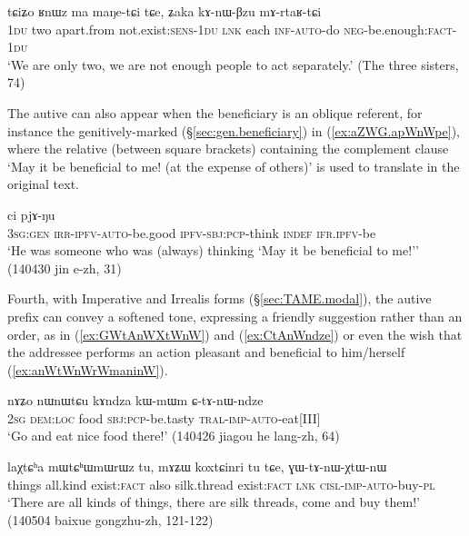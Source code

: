    \begin{exe}
\ex \label{ex:kAnWBzu.mArtaRtCi}
\gll tɕiʑo ʁnɯz ma maŋe-tɕi tɕe, ʑaka kɤ-nɯ-βzu mɤ-rtaʁ-tɕi \\
\textsc{1du} two apart.from not.exist:\textsc{sens}-\textsc{1du} \textsc{lnk} each \textsc{inf}-\textsc{auto}-do \textsc{neg}-be.enough:\textsc{fact}-\textsc{1du} \\
\glt `We are only two, we are not enough people to act separately.' (The three sisters, 74)
\end{exe} 

The autive can also appear when the beneficiary is an oblique referent, for instance the genitively-marked  (§\ref{sec:gen.beneficiary}) in (\ref{ex:aZWG.apWnWpe}), where the relative (between square brackets) containing the complement clause  `May it be beneficial to me! (at the expense of others)' is used to translate  in the original text.

   \begin{exe}
\ex \label{ex:aZWG.apWnWpe}
 ci pjɤ-ŋu \\
\textsc{3sg}:\textsc{gen} \textsc{irr}-\textsc{ipfv}-\textsc{auto}-be.good \textsc{ipfv}-\textsc{sbj}:\textsc{pcp}-think \textsc{indef} \textsc{ifr}.\textsc{ipfv}-be   \\
\glt `He was someone who was (always) thinking `May it be beneficial to me!'' (140430 jin e-zh, 31)
\end{exe} 

Fourth, with Imperative and Irrealis forms (§\ref{sec:TAME.modal}), the autive prefix can convey a softened tone, expressing a friendly suggestion rather than an order, as in   (\ref{ex:GWtAnWXtWnW}) and (\ref{ex:CtAnWndze}) or even the wish that the addressee performs an action pleasant and beneficial to him/herself (\ref{ex:anWtWnWrWmaninW}).


\begin{exe}
\ex \label{ex:CtAnWndze}
\gll nɤʑo nɯnɯtɕu kɤndza kɯ-mɯm ɕ-tɤ-nɯ-ndze  \\
\textsc{2sg} \textsc{dem}:\textsc{loc} food \textsc{sbj}:\textsc{pcp}-be.tasty \textsc{tral}-\textsc{imp}-\textsc{auto}-eat[III] \\
\glt `Go and eat nice food there!' (140426 jiagou he lang-zh, 64)
\end{exe}

\begin{exe}
\ex \label{ex:GWtAnWXtWnW}
\gll laχtɕʰa mɯtɕʰɯmɯrɯz tu, mɤʑɯ koxtɕinri tu tɕe, ɣɯ-tɤ-nɯ-χtɯ-nɯ \\ 
things all.kind exist:\textsc{fact} also silk.thread exist:\textsc{fact} \textsc{lnk} \textsc{cisl}-\textsc{imp}-\textsc{auto}-buy-\textsc{pl} \\
\glt `There are all kinds of things, there are silk threads, come and buy them!' (140504 baixue gongzhu-zh, 121-122)
\end{exe}

